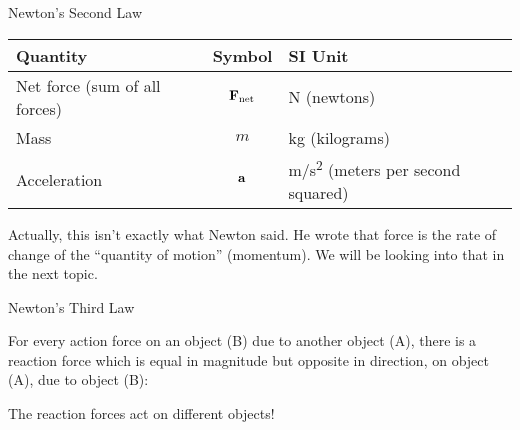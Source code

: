 \documentclass[12pt,compress,aspectratio=169]{beamer}
\newcommand{\mb}[1]{\ensuremath\mathbf{#1}}
\newcommand{\eq}[2]{\vspace{#1}{\Large\begin{displaymath}#2\end{displaymath}}}
\begin{document}
\begin{frame}{Newton's Second Law}
  \begin{center}
  \end{center}

  \eq{-.2in}{
    \boxed{\mb{F}_{\textrm{net}}=\Sigma\mb{F}=m\mb{a}}
  }
  
  \begin{center}
    \begin{tabular}{l|c|l}
      \rowcolor{pink}
      \textbf{Quantity} & \textbf{Symbol} & \textbf{SI Unit} \\ \hline
      Net force (sum of all forces)  & $\mb{F}_{\textrm{net}}$ &
      \si{N} (newtons)\\
      Mass         & $m$       & \si{kg} (kilograms) \\
      Acceleration & $\mb{a}$  & \si{m/s^2} (meters per second squared) \\
    \end{tabular}
  \end{center}

  Actually, this isn't exactly what Newton said. He wrote that force is the
  rate of change of the ``quantity of motion'' (momentum). We will be looking
  into that in the next topic.
\end{frame}


\begin{frame}{Newton's Third Law}

  \begin{center}
  \end{center}
 
  For every action force on an object (B) due to another object (A), there is a
  reaction force which is equal in magnitude but opposite in direction, on
  object (A), due to object (B):

  \eq{-.2in}{
    \boxed{\mb{F}_{\textrm{A on B}} = -\mb{F}_{\textrm{B on A}}}
  }
  
  The reaction forces act on different objects!
\end{frame}
\end{document}
